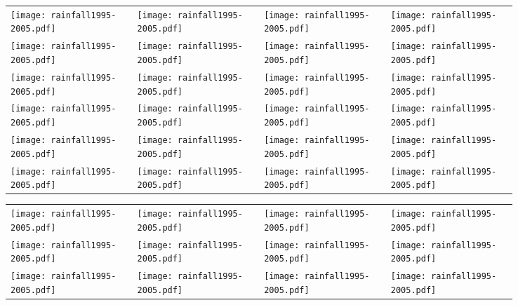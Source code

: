 \documentclass[]{article} %
\begin{document}
\noindent\centering
\begin{tabular}{p{0.21\linewidth}p{0.21\linewidth}p{0.21\linewidth}p{0.21\linewidth}}
\texttt{[image: rainfall1995-2005.pdf]} & \texttt{[image: rainfall1995-2005.pdf]} & \texttt{[image: rainfall1995-2005.pdf]} & \texttt{[image: rainfall1995-2005.pdf]}\\
\texttt{[image: rainfall1995-2005.pdf]} & \texttt{[image: rainfall1995-2005.pdf]} & \texttt{[image: rainfall1995-2005.pdf]} & \texttt{[image: rainfall1995-2005.pdf]}\\
\texttt{[image: rainfall1995-2005.pdf]} & \texttt{[image: rainfall1995-2005.pdf]} & \texttt{[image: rainfall1995-2005.pdf]} & \texttt{[image: rainfall1995-2005.pdf]}\\
%
%
\texttt{[image: rainfall1995-2005.pdf]} & \texttt{[image: rainfall1995-2005.pdf]} & \texttt{[image: rainfall1995-2005.pdf]} & \texttt{[image: rainfall1995-2005.pdf]} \\
\texttt{[image: rainfall1995-2005.pdf]} & \texttt{[image: rainfall1995-2005.pdf]} & \texttt{[image: rainfall1995-2005.pdf]}     & \texttt{[image: rainfall1995-2005.pdf]} \\
\texttt{[image: rainfall1995-2005.pdf]} & \texttt{[image: rainfall1995-2005.pdf]} & \texttt{[image: rainfall1995-2005.pdf]}     & \texttt{[image: rainfall1995-2005.pdf]} \\
\end{tabular}
\clearpage
\noindent
\begin{tabular}{p{0.21\linewidth}p{0.21\linewidth}p{0.21\linewidth}p{0.21\linewidth}}
\texttt{[image: rainfall1995-2005.pdf]} & \texttt{[image: rainfall1995-2005.pdf]} & \texttt{[image: rainfall1995-2005.pdf]} & \texttt{[image: rainfall1995-2005.pdf]} \\
\texttt{[image: rainfall1995-2005.pdf]} & \texttt{[image: rainfall1995-2005.pdf]} & \texttt{[image: rainfall1995-2005.pdf]}     & \texttt{[image: rainfall1995-2005.pdf]} \\
\texttt{[image: rainfall1995-2005.pdf]} & \texttt{[image: rainfall1995-2005.pdf]} & \texttt{[image: rainfall1995-2005.pdf]}     & \texttt{[image: rainfall1995-2005.pdf]} \\
\end{tabular}
\end{document}
